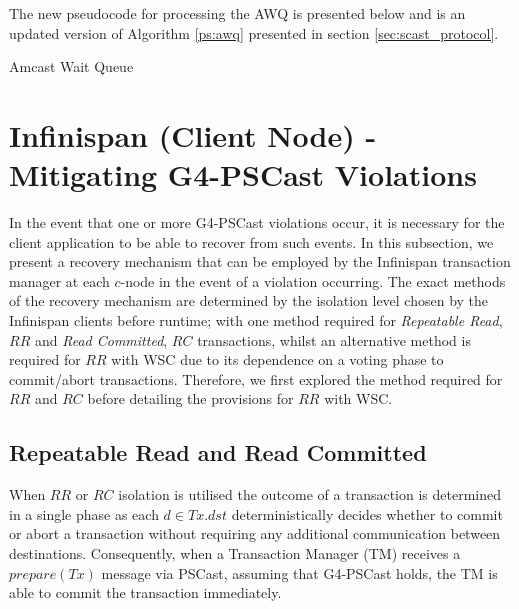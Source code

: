 The new pseudocode for processing the AWQ is presented below and is an updated version of Algorithm \ref{ps:awq} presented in section \ref{sec:scast_protocol}.  

\begin{algorithm}[H]
       \caption{Amcast Wait Queue}
        \label{ps:awq_with_exception}
        \begin{algorithmic}[1]
	            \ENDIF
	            \ENDIF
	        \ENDWHILE
        \end{algorithmic}
    \end{algorithm}   

\section{Infinispan (Client Node) - Mitigating G4-PSCast Violations}
    In the event that one or more G4-PSCast violations occur, it is necessary for the client application to be able to recover from such events.  In this subsection, we present a recovery mechanism that can be employed by the Infinispan transaction manager at each $c$-node in the event of a violation occurring.  The exact methods of the recovery mechanism are determined by the isolation level chosen by the Infinispan clients before runtime; with one method required for \emph{Repeatable Read}, $RR$ and \emph{Read Committed}, $RC$ transactions, whilst an alternative method is required for $RR$ with WSC due to its dependence on a voting phase to commit/abort transactions.  Therefore, we first explored the method required for $RR$ and $RC$ before detailing the provisions for $RR$ with WSC.  
    
    \subsection{Repeatable Read and Read Committed}
    When $RR$ or $RC$ isolation is utilised the outcome of a transaction is determined in a single phase as each $d \in Tx.dst$ deterministically decides whether to commit or abort a transaction without requiring any additional communication between destinations.  Consequently, when a Transaction Manager (TM) receives a $prepare(Tx)$ message via \textsf{PSCast}, assuming that G4-PSCast holds, the TM is able to commit the transaction immediately.  
    
